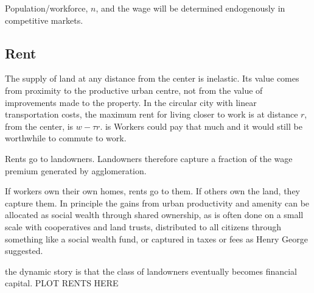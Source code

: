 Population/workforce, $n$, and the wage will be determined endogenously in competitive markets. 


 \subsection{Rent}
\label{Sec:Rent}


The supply of land at any distance from the center is inelastic. 
Its value comes from proximity to the productive urban centre, not from the value of improvements made to the property. 
In the circular city with linear transportation costs, the maximum rent for living closer to work is at distance $r$, from the center, is $w-\tau r$.  is Workers could pay that much and it would still be worthwhile to commute to work. 

Rents go to landowners. %
Landowners therefore capture a fraction of the wage premium generated by agglomeration.

If workers own their own homes, rents go to them. If others own the land, they capture them. %
In principle the gains from urban productivity and amenity can be allocated as social wealth through shared ownership, as is often done on a small scale with cooperatives and land trusts, distributed to all citizens through something like a social wealth fund, or captured in taxes or fees as Henry George suggested. 

the dynamic story is that the class of landowners eventually becomes financial capital.
PLOT RENTS HERE


